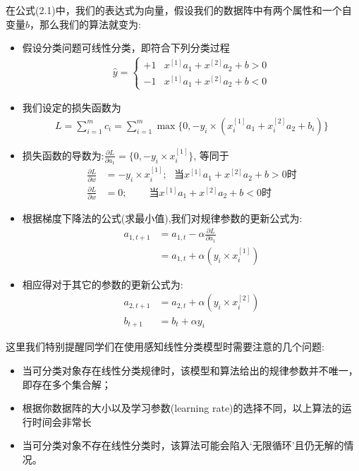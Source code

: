 \documentclass[12pt]{article}
\numberwithin{figure}{section}
\newenvironment{fullmodel}{
			\smallskip\noindent
			\begin{minipage}{\textwidth+\marginparwidth+\marginparsep}\smallskip\smallskip}
			{\smallskip\smallskip\end{minipage}\vspace{.1in}
			}
\numberwithin{equation}{section}
\begin{document}
在公式(2.1)中，我们的表达式为向量，假设我们的数据阵中有两个属性和一个自变量$b$，那么我们的算法就变为: 
\begin{itemize}
	\item 假设分类问题可线性分类，即符合下列分类过程 \begin{align*}
		\hat{y} = \begin{cases}
			+1 & x^{[1]} a_1 + x^{[2]} a_2 + b > 0 \\
			-1 & x^{[1]} a_1 + x^{[2]} a_2 + b < 0
		\end{cases}
	\end{align*}
	\item 我们设定的损失函数为 \begin{align*}
		L = \sum_{i=1}^m c_i = \sum_{i=1}^m \max \{ 0, - y_i \times (x^{[1]}_i a_1 + x^{[2]}_i a_2 + b_i) \} 
	\end{align*}
	\item 损失函数的导数为:$\frac{\partial L}{\partial a_1} = \{ 0, -y_i \times x_i^{[1]} \}$, 等同于
	\begin{align*}
		\frac{\partial L}{\partial w} & = - y_i \times x_i^{[1]}; \ \ \ \text{当$x^{[1]} a_1 + x^{[2]} a_2 + b > 0$时} \\
		\frac{\partial L}{\partial w} & = 0; \ \ \ \ \ \ \ \ \ \ \text{当$x^{[1]} a_1 + x^{[2]} a_2 + b < 0$时}
	\end{align*}
	\item 根据梯度下降法的公式(求最小值),我们对规律参数的更新公式为: \begin{align*}
		a_{1, t+1} & = a_{1, t} - \alpha \frac{\partial L}{\partial a_1} \\
		& = a_{1, t} + \alpha (y_i \times x_i^{[1]})
	\end{align*}
	\item 相应得对于其它的参数的更新公式为: 
	\begin{align*}
		a_{2, t+1} & = a_{2, t} + \alpha (y_i \times x_i^{[2]}) \\
		b_{t+1} & = b_{t}  + \alpha y_i
	\end{align*}
\end{itemize}


\begin{fullmodel}
	\begin{tcolorbox}[title=有关感知线性分类算法的几个问题]
		这里我们特别提醒同学们在使用感知线性分类模型时需要注意的几个问题: 
		\begin{itemize}
			\item 当可分类对象存在线性分类规律时，该模型和算法给出的规律参数并不唯一，即存在多个集合解；
			\item 根据你数据阵的大小以及学习参数(learning rate)的选择不同，以上算法的运行时间会非常长
			\item 当可分类对象不存在线性分类时，该算法可能会陷入`无限循环'且仍无解的情况。
		\end{itemize}
	\end{tcolorbox}
\end{fullmodel}
\end{document}
